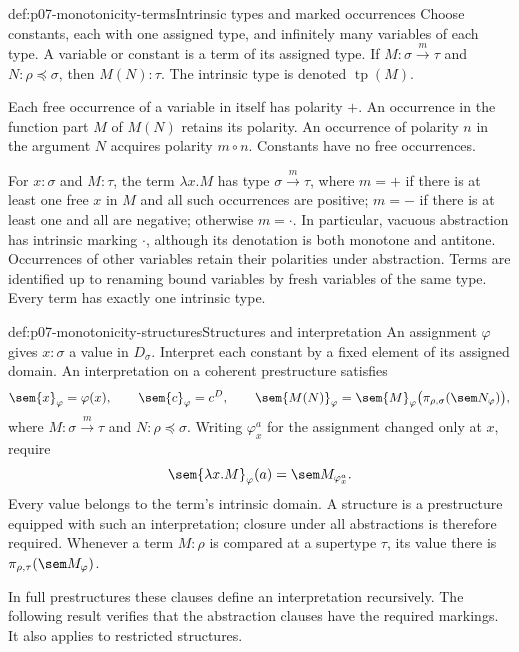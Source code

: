 \begin{hbdefinition}{def:p07-monotonicity-terms}{Intrinsic types and marked occurrences}
Choose constants, each with one assigned type, and infinitely many
variables of each type. A variable or constant is a term of its assigned
type. If \(M:\sigma\xrightarrow m\tau\) and \(N:\rho\preceq\sigma\),
then \(M(N):\tau\). The intrinsic type is denoted \(\operatorname{tp}(M)\).

Each free occurrence of a variable in itself has polarity \(+\).
An occurrence in the function part \(M\) of \(M(N)\) retains its polarity.
An occurrence of polarity \(n\) in the argument \(N\) acquires polarity
\(m\circ n\). Constants have no free occurrences.

For \(x:\sigma\) and \(M:\tau\), the term \(\lambda x.M\) has type
\(\sigma\xrightarrow m\tau\), where \(m=+\) if there is at least one free
\(x\) in \(M\) and all such occurrences are positive; \(m=-\) if there is
at least one and all are negative; otherwise \(m=\cdot\).
In particular, vacuous abstraction has intrinsic marking \(\cdot\),
although its denotation is both monotone and antitone.
Occurrences of other variables retain their polarities under abstraction.
Terms are identified up to renaming bound variables by fresh variables of
the same type. Every term has exactly one intrinsic type.
\end{hbdefinition}

\begin{hbdefinition}{def:p07-monotonicity-structures}{Structures and interpretation}
An assignment \(\varphi\) gives \(x:\sigma\) a value in \(D_\sigma\).
Interpret each constant by a fixed element of its assigned domain.
An interpretation on a coherent prestructure satisfies
\[
 \sem{x}_\varphi=\varphi(x),\qquad
 \sem{c}_\varphi=c^D,\qquad
 \sem{M(N)}_\varphi
 =\sem{M}_\varphi\bigl(\pi_{\rho,\sigma}(\sem N_\varphi)\bigr),
\]
where \(M:\sigma\xrightarrow m\tau\) and \(N:\rho\preceq\sigma\).
Writing \(\varphi_x^a\) for the assignment changed only at \(x\), require
\[
 \sem{\lambda x.M}_\varphi(a)=\sem M_{\varphi_x^a}.
\]
Every value belongs to the term's intrinsic domain. A structure is a
prestructure equipped with such an interpretation; closure under all
abstractions is therefore required. Whenever a term \(M:\rho\) is compared
at a supertype \(\tau\), its value there is
\(\pi_{\rho,\tau}(\sem M_\varphi)\).

In full prestructures these clauses define an interpretation recursively.
The following result verifies that the abstraction clauses have the required
markings. It also applies to restricted structures.
\end{hbdefinition}

